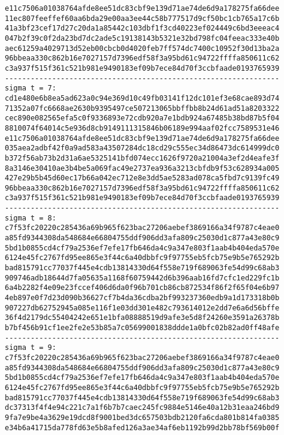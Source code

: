 \documentclass{article}
\begin{document}
{\begin{verbatim}
e11c7506a01038764afde8ee51dc83cbf9e139d71ae74de6d9a178275fa66dee
11ec807feeffef60aa6bda29e00aa3ee44c58b777517d9cf50bc1cb765a17c6b
41a3bf23cef17d27c20da1a85442c103dbf1f3cd40223ef024449c6bd3eeeac4
047b2f39c0f2da23bd7dc2ade5c19138143b5321e32bd798fc04feeac333e40b
aec61259a4029713d52eb00cbcb0d4020feb7ff574dc7400c10952f30d13ba2a
96bbeaa330c862b16e7027157d7396edf58f3a95bd61c94722ffffa850611c62
c3a937f515f361c521b981e9490183ef09b7ece84d70f3ccbfaade0193765939
----------------------------------------------------------------
sigma t = 7:
cd1e480e6b8ea5ad623a0c94e369d10c49fb03141f12dc101ef3e68cae893d74
71352a07fc6668ae2630b9395497ce507213065bbffbb8b24d61ad51a8203322
cec890e082565efa5c0f9336893e72cdb920a7e1bdb924a67485b38bd87b5f04
8810074f64014c5e936d8cb9149111315846b06189e994aaf02fcc7589531e46
e11c7506a01038764afde8ee51dc83cbf9e139d71ae74de6d9a178275fa66dee
035aea2adbf42f0a9ad583a43507284dc18cd29c555ec34d86473dc614999dc0
b372f56ab73b2d31a6ae5325141bfd074ecc1626f9720a21004a3ef2d4eafe3f
8a3146e30410ae3b4be5a069fac49e2737ea936a3213cbfdb9f53c628934a005
427e29b5b45d60ec17b66a042ec712e8e3dd5ae5283ad078ca5fbd7c9139fc49
96bbeaa330c862b16e7027157d7396edf58f3a95bd61c94722ffffa850611c62
c3a937f515f361c521b981e9490183ef09b7ece84d70f3ccbfaade0193765939
----------------------------------------------------------------
sigma t = 8:
c7f53fc20220c285436a69b965f623bac27206aebef3869166a34f9787c4eae0
a85fd9344308da548684e66804755ddf906dd3afa809c25030d1c877a43e80c9
5bd1b0855cd4cf79a2536ef7efe17fb646da4c9a347e803f1aab4b404eda570e
6124e45fc2767fd95ee865e3f44c6a40dbbfc9f97755eb5fcb75e9b5e765292b
bad815791cc77037f445e4cdb13814330d64f558e719f689063fe54d99c68ab3
909746adb18644d7fa05635a1168f60759442d6b396aab16fd7cfc1ed229fc1b
6a4b2282f4e09e23fccef406d6da0f96b701cb86cb872534f86f2f65f04e6b97
4eb897e0f7d23d090b36627cf7b4da36cdba2bf993237360edb9a1d173318b0b
907227db62752945a085e116f1e03dd301e482c793614012e2dd7e6a6d56bffe
36f4d2179dc55404242e651e1bfa08888519d9afe3e5d8f24260e3591a26378b
b7bf456b91cf1ee2fe2e53b85a7c05699001838ddde1a0bfc02b82ad0ff48afe
----------------------------------------------------------------
sigma t = 9:
c7f53fc20220c285436a69b965f623bac27206aebef3869166a34f9787c4eae0
a85fd9344308da548684e66804755ddf906dd3afa809c25030d1c877a43e80c9
5bd1b0855cd4cf79a2536ef7efe17fb646da4c9a347e803f1aab4b404eda570e
6124e45fc2767fd95ee865e3f44c6a40dbbfc9f97755eb5fcb75e9b5e765292b
bad815791cc77037f445e4cdb13814330d64f558e719f689063fe54d99c68ab3
dc37313f4f4e94c221c7a1f6b7b7caec245fc9884e5146e40a12b31eaa246bd9
9fa7e9be4a3629e19dcd8f9001bed3dc657503bdb2120fa6cda801b814fa0385
e34b6a41715da778fd63e5b8afed126a3ae34af6eb1192b99d2bb78bf569b00f

\end{verbatim}}
\end{document}

